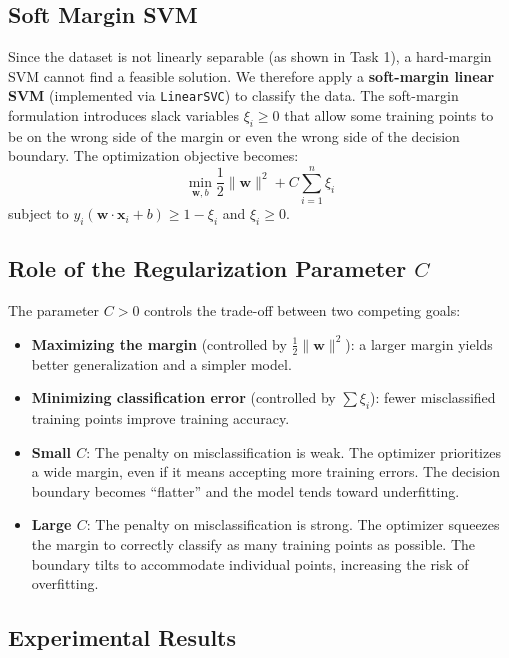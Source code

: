 \documentclass[a4paper,12pt]{article}
\begin{document}
\subsection{Soft Margin SVM}

Since the dataset is not linearly separable (as shown in Task 1), a hard-margin SVM cannot find a feasible solution. We therefore apply a \textbf{soft-margin linear SVM} (implemented via \texttt{LinearSVC}) to classify the data. The soft-margin formulation introduces slack variables $\xi_i \geq 0$ that allow some training points to be on the wrong side of the margin or even the wrong side of the decision boundary. The optimization objective becomes:
\[
\min_{\mathbf{w}, b} \frac{1}{2}\|\mathbf{w}\|^2 + C \sum_{i=1}^{n} \xi_i
\]
subject to $y_i(\mathbf{w} \cdot \mathbf{x}_i + b) \geq 1 - \xi_i$ and $\xi_i \geq 0$.

\subsection{Role of the Regularization Parameter $C$}

The parameter $C > 0$ controls the trade-off between two competing goals:
\begin{itemize}
    \item \textbf{Maximizing the margin} (controlled by $\frac{1}{2}\|\mathbf{w}\|^2$): a larger margin yields better generalization and a simpler model.
    \item \textbf{Minimizing classification error} (controlled by $\sum \xi_i$): fewer misclassified training points improve training accuracy.
\end{itemize}

\begin{itemize}
    \item \textbf{Small $C$}: The penalty on misclassification is weak. The optimizer prioritizes a wide margin, even if it means accepting more training errors. The decision boundary becomes ``flatter'' and the model tends toward underfitting.
    \item \textbf{Large $C$}: The penalty on misclassification is strong. The optimizer squeezes the margin to correctly classify as many training points as possible. The boundary tilts to accommodate individual points, increasing the risk of overfitting.
\end{itemize}

\subsection{Experimental Results}
\end{document}
